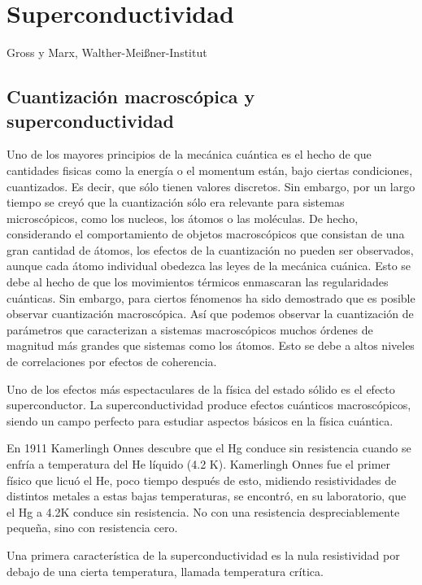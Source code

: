 \chapter{Superconductividad}

Gross y Marx, Walther-Meißner-Institut \cite{gross}

\section{Cuantización macroscópica y superconductividad}

Uno de los mayores principios de la mecánica cuántica es el hecho de que cantidades fisicas como la energía o el momentum están, bajo ciertas condiciones, cuantizados. Es decir, que sólo tienen valores discretos. Sin embargo, por un largo tiempo se creyó que la cuantización sólo era relevante para sistemas microscópicos, como los nucleos, los átomos o las moléculas. De hecho, considerando el comportamiento de objetos macroscópicos que consistan de una gran cantidad de átomos, los efectos de la cuantización no pueden ser observados, aunque cada átomo individual obedezca las leyes de la mecánica cuánica. Esto se debe al hecho de que los movimientos térmicos enmascaran las regularidades cuánticas. Sin embargo, para ciertos fénomenos ha sido demostrado que es posible observar cuantización macroscópica. Así que podemos observar la cuantización de parámetros que caracterizan a sistemas macroscópicos muchos órdenes de magnitud más grandes que sistemas como los átomos. Esto se debe a altos niveles de correlaciones por efectos de coherencia.

Uno de los efectos más espectaculares de la física del estado sólido es el efecto superconductor. La superconductividad produce efectos cuánticos macroscópicos, siendo un campo perfecto para estudiar aspectos básicos en la física cuántica.

En 1911 Kamerlingh Onnes descubre que el Hg conduce sin resistencia cuando se enfría a temperatura del He líquido (4.2 K). Kamerlingh Onnes fue el primer físico que licuó el He, poco tiempo después de esto, midiendo resistividades de distintos metales a estas bajas temperaturas, se encontró, en su laboratorio, que el Hg a 4.2K conduce sin resistencia. No con una resistencia despreciablemente pequeña, sino con resistencia cero.

Una primera característica de la superconductividad es la nula resistividad por debajo de una cierta temperatura, llamada temperatura crítica.

